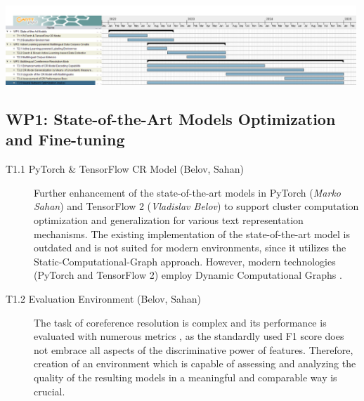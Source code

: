 \includegraphics[width=0.99\textwidth]{./figs/Timeschedule}

\subsection*{WP1: State-of-the-Art Models Optimization and Fine-tuning}

%
%
%
%


\begin{description}
	\item [T1.1 PyTorch \& TensorFlow CR Model (Belov, Sahan)] Further enhancement of the state-of-the-art models in PyTorch (\textit{Marko Sahan}) and TensorFlow 2 (\textit{Vladislav Belov}) to support cluster computation optimization and generalization for various text representation mechanisms. The existing implementation of the state-of-the-art model is outdated and is not suited for modern environments, since it utilizes the Static-Computational-Graph approach. However, modern technologies (PyTorch and TensorFlow 2) employ Dynamic Computational Graphs \cite{computationalgraph-Neubig2017}.  
	\item [T1.2 Evaluation Environment (Belov, Sahan)] The task of coreference resolution is complex and its performance is evaluated with numerous metrics \cite{muc-Vilain1995,b3-Bagga1998,ceaf-Luo2005}, as the standardly used F1 score \cite{f1-Chen2006} does not embrace all aspects of the discriminative power of features. Therefore, creation of an environment which is capable of assessing and analyzing the quality of the resulting models in a meaningful and comparable way is crucial.
\end{description}


